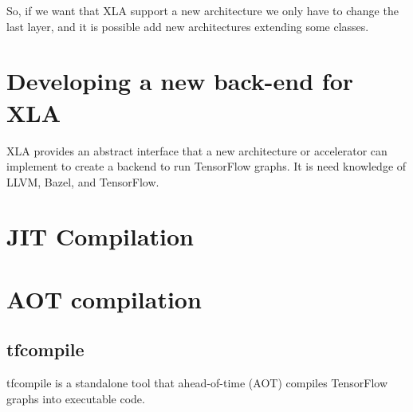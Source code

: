 \documentclass[11pt,openany]{book}
\begin{document}
So, if we want that XLA support a new architecture we only have to change the last layer, and it is possible add new architectures extending some classes.

\section{Developing a new back-end for XLA}

XLA provides an abstract interface that a new architecture or accelerator can implement to create a backend to run TensorFlow graphs. It is need knowledge of LLVM, Bazel, and TensorFlow.

\section{JIT Compilation}

\section{AOT compilation}
\subsection{tfcompile}

tfcompile is a standalone tool that ahead-of-time (AOT) compiles TensorFlow graphs into executable code. 





\appendix %
\printnotes*
\end{document}
